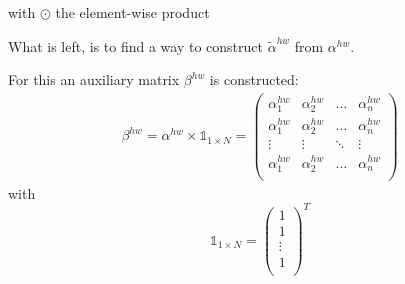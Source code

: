 with $\odot$ the element-wise product

What is left, is to find a way to construct $\tilde{\alpha}^{hw}$ from $\alpha^{hw}$.

For this an auxiliary matrix $\beta^{hw}$ is constructed:
\begin{align}
    \beta^{hw} = \alpha^{hw} \times \mathbb{1}_{1 \times N} = 
    \begin{pmatrix}
        \alpha^{hw}_1 & \alpha^{hw}_2 & \hdots & \alpha^{hw}_n\\
        \alpha^{hw}_1 & \alpha^{hw}_2 & \hdots & \alpha^{hw}_n\\
        \vdots & \vdots & \ddots & \vdots \\
        \alpha^{hw}_1 & \alpha^{hw}_2 & \hdots & \alpha^{hw}_n\\
    \end{pmatrix}
\end{align}
with
$$
\mathbb{1}_{1 \times N} = \begin{pmatrix}
        1 \\
        1 \\
        \vdots\\
        1 \\
    \end{pmatrix}^T
$$

